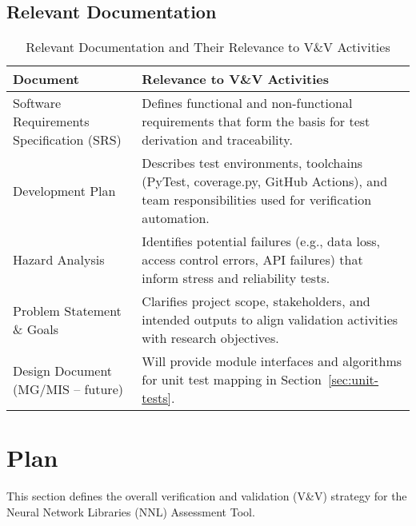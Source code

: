 \documentclass[12pt, titlepage]{article}
\begin{document}
\subsection{Relevant Documentation}
\label{subsec:relevant-docs}


\begin{table}[H]
\centering
\caption{Relevant Documentation and Their Relevance to V\&V Activities}
\setlength{\tabcolsep}{5pt}
\renewcommand{\arraystretch}{1.2}
\footnotesize

\begin{tabularx}{\textwidth}{l X}
\toprule
\textbf{Document} & \textbf{Relevance to V\&V Activities} \\
\midrule
\arrayrulecolor[gray]{0.8}
Software Requirements Specification (SRS) &
Defines functional and non-functional requirements that form the basis for
test derivation and traceability. \\
\hline
Development Plan &
Describes test environments, toolchains (PyTest, coverage.py, GitHub Actions),
and team responsibilities used for verification automation. \\
\hline
Hazard Analysis &
Identifies potential failures (e.g., data loss, access control errors, API
failures) that inform stress and reliability tests. \\
\hline
Problem Statement \& Goals &
Clarifies project scope, stakeholders, and intended outputs to align validation
activities with research objectives. \\
\hline
Design Document (MG/MIS – future) &
Will provide module interfaces and algorithms for unit test mapping in
Section~\ref{sec:unit-tests}. \\
\bottomrule
\end{tabularx}
\end{table}

\section{Plan}
\label{sec:plan}
This section defines the overall verification and validation (V\&V) strategy for
the Neural Network Libraries (NNL) Assessment Tool.
\end{document}
